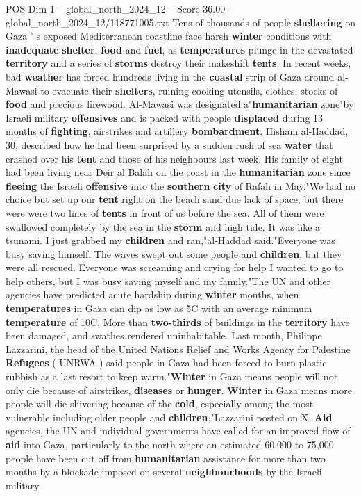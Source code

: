 \begin{textsample}{POS Dim 1 – global\_north\_2024\_12 – Score 36.00 – global\_north\_2024\_12/118771005.txt}  \label{ex:f1_pos_222}
Tens of thousands of people \textbf{sheltering} on Gaza ' s exposed Mediterranean coastline face harsh \textbf{winter} conditions with \textbf{inadequate} \textbf{shelter}, \textbf{food} and \textbf{fuel}, as \textbf{temperatures} plunge in the devastated \textbf{territory} and a series of \textbf{storms} destroy their makeshift \textbf{tents}.
In recent weeks, bad \textbf{weather} has forced hundreds living in the \textbf{coastal} strip of Gaza around al-Mawasi to evacuate their \textbf{shelters}, ruining cooking utensils, clothes, stocks of \textbf{food} and precious firewood.
Al-Mawasi was designated a"\textbf{humanitarian} zone"by Israeli military \textbf{offensives} and is packed with people \textbf{displaced} during 13 months of \textbf{fighting}, airstrikes and artillery \textbf{bombardment}.
Hisham al-Haddad, 30, described how he had been surprised by a sudden rush of sea \textbf{water} that crashed over his \textbf{tent} and those of his neighbours last week.
His family of eight had been living near Deir al Balah on the coast in the \textbf{humanitarian} zone since \textbf{fleeing} the Israeli \textbf{offensive} into the \textbf{southern} \textbf{city} of Rafah in May."We had no choice but set up our \textbf{tent} right on the beach sand due lack of space, but there were were two lines of \textbf{tents} in front of us before the sea.
All of them were swallowed completely by the sea in the \textbf{storm} and high tide.
It was like a tsunami.
I just grabbed my \textbf{children} and ran,"al-Haddad said."Everyone was busy saving himself.
The waves swept out some people and \textbf{children}, but they were all rescued.
Everyone was screaming and crying for help I wanted to go to help others, but I was busy saving myself and my family."The UN and other agencies have predicted acute hardship during \textbf{winter} months, when \textbf{temperatures} in Gaza can dip as low as 5C with an average minimum \textbf{temperature} of 10C.
More than \textbf{two-thirds} of buildings in the \textbf{territory} have been damaged, and swathes rendered uninhabitable.
Last month, Philippe Lazzarini, the head of the United Nations Relief and Works Agency for Palestine \textbf{Refugees} ( UNRWA ) said people in Gaza had been forced to burn plastic rubbish as a last resort to keep warm."\textbf{Winter} in Gaza means people will not only die because of airstrikes, \textbf{diseases} or \textbf{hunger}. \textbf{Winter} in Gaza means more people will die shivering because of the \textbf{cold}, especially among the most vulnerable including older people and \textbf{children},"Lazzarini posted on X. \textbf{Aid} agencies, the UN and individual governments have called for an improved flow of \textbf{aid} into Gaza, particularly to the north where an estimated 60,000 to 75,000 people have been cut off from \textbf{humanitarian} assistance for more than two months by a blockade imposed on several \textbf{neighbourhoods} by the Israeli military.

\end{textsample}
